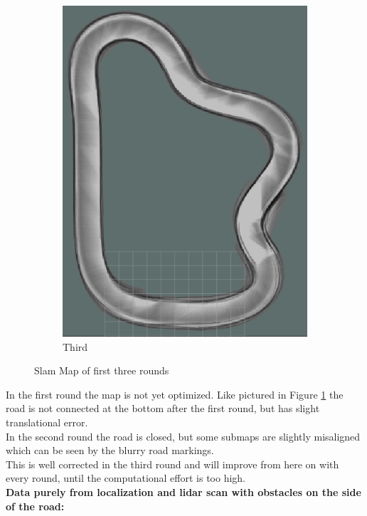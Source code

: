 \begin{figure}[H]
\begin{subfigure}{.3\linewidth}
		\includegraphics[width=\textwidth]{Pictures/1slamtest3}
		\caption{Third}
	\end{subfigure}

	\caption{Slam Map of first three rounds}
	\label{1slamtest}

\end{figure}

In the first round the map is not yet optimized. Like pictured in  Figure \ref{1slamtest} the road is not connected at the bottom after the first round, but has slight translational error.\\
In the second round the road is closed, but some submaps are slightly misaligned which can be seen by the blurry road markings.\\
This is well corrected in the third round and will improve from here on with every round, until the computational effort is too high.\\
\textbf{Data purely from localization and lidar scan with obstacles on the side of the road:}\\


